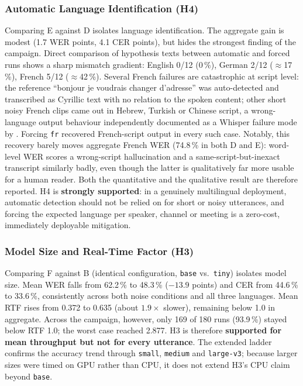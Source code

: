 \documentclass[12pt]{report}
\begin{document}
\subsubsection{Automatic Language Identification (H4)}
Comparing E against D isolates language identification. The aggregate gain is modest (1.7 WER points, 4.1 CER points), but hides the strongest finding of the campaign. Direct comparison of hypothesis texts between automatic and forced runs shows a sharp mismatch gradient: English 0/12 (0\,\%), German 2/12 ($\approx$17\,\%), French 5/12 ($\approx$42\,\%). Several French failures are catastrophic at script level: the reference \enquote{bonjour je voudrais changer d'adresse} was auto-detected and transcribed as Cyrillic text with no relation to the spoken content; other short noisy French clips came out in Hebrew, Turkish or Chinese script, a wrong-language output behaviour independently documented as a Whisper failure mode by \cite{koenecke2024careless}. Forcing \texttt{fr} recovered French-script output in every such case. Notably, this recovery barely moves aggregate French WER (74.8\,\% in both D and E): word-level WER scores a wrong-script hallucination and a same-script-but-inexact transcript similarly badly, even though the latter is qualitatively far more usable for a human reader. Both the quantitative and the qualitative result are therefore reported. H4 is \textbf{strongly supported}: in a genuinely multilingual deployment, automatic detection should not be relied on for short or noisy utterances, and forcing the expected language per speaker, channel or meeting is a zero-cost, immediately deployable mitigation.
\subsubsection{Model Size and Real-Time Factor (H3)}
Comparing F against B (identical configuration, \texttt{base} vs.\ \texttt{tiny}) isolates model size. Mean WER falls from 62.2\,\% to 48.3\,\% ($-13.9$ points) and CER from 44.6\,\% to 33.6\,\%, consistently across both noise conditions and all three languages. Mean RTF rises from 0.372 to 0.635 (about $1.9\times$ slower), remaining below 1.0 in aggregate. Across the campaign, however, only 169 of 180 runs (93.9\,\%) stayed below RTF 1.0; the worst case reached 2.877. H3 is therefore \textbf{supported for mean throughput but not for every utterance}. The extended ladder confirms the accuracy trend through \texttt{small}, \texttt{medium} and \texttt{large-v3}; because larger sizes were timed on GPU rather than CPU, it does not extend H3's CPU claim beyond \texttt{base}.
\end{document}
